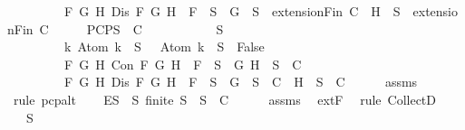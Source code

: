 \begin{isabellebody}
\ \ \ \ \ \ \ \ \ {\isacharparenleft}{\isasymforall}F\ G\ H{\isachardot}\ Dis\ F\ G\ H\ {\isasymlongrightarrow}\ F\ {\isasymin}\ S\ {\isasymlongrightarrow}\ {\isacharbraceleft}G{\isacharbraceright}\ {\isasymunion}\ S\ {\isasymin}\ {\isacharparenleft}extensionFin\ C{\isacharparenright}\ {\isasymor}\ {\isacharbraceleft}H{\isacharbraceright}\ {\isasymunion}\ S\ {\isasymin}\ {\isacharparenleft}extensionFin\ C{\isacharparenright}{\isacharparenright}{\isachardoublequoteclose}\isanewline
%
\isadelimproof
%
\endisadelimproof
%
\isatagproof
{}\isamarkupfalse%
\ {\isacharminus}\isanewline
\ \ \isamarkupfalse%
\ PCP{\isacharcolon}{\isachardoublequoteopen}{\isasymforall}S\ {\isasymin}\ C{\isachardot}\isanewline
\ \ \ \ \ \ \ \ \ {\isasymbottom}\ {\isasymnotin}\ S\ {\isasymand}\isanewline
\ \ \ \ \ \ \ \ \ {\isacharparenleft}{\isasymforall}k{\isachardot}\ Atom\ k\ {\isasymin}\ S\ {\isasymlongrightarrow}\ \isactrlbold {\isasymnot}\ {\isacharparenleft}Atom\ k{\isacharparenright}\ {\isasymin}\ S\ {\isasymlongrightarrow}\ False{\isacharparenright}\ {\isasymand}\isanewline
\ \ \ \ \ \ \ \ \ {\isacharparenleft}{\isasymforall}F\ G\ H{\isachardot}\ Con\ F\ G\ H\ {\isasymlongrightarrow}\ F\ {\isasymin}\ S\ {\isasymlongrightarrow}\ {\isacharbraceleft}G{\isacharcomma}\ H{\isacharbraceright}\ {\isasymunion}\ S\ {\isasymin}\ C{\isacharparenright}\ {\isasymand}\isanewline
\ \ \ \ \ \ \ \ \ {\isacharparenleft}{\isasymforall}F\ G\ H{\isachardot}\ Dis\ F\ G\ H\ {\isasymlongrightarrow}\ F\ {\isasymin}\ S\ {\isasymlongrightarrow}\ {\isacharbraceleft}G{\isacharbraceright}\ {\isasymunion}\ S\ {\isasymin}\ C\ {\isasymor}\ {\isacharbraceleft}H{\isacharbraceright}\ {\isasymunion}\ S\ {\isasymin}\ C{\isacharparenright}{\isachardoublequoteclose}\isanewline
\ \ \ \ \isamarkupfalse%
\ assms{\isacharparenleft}{}{\isacharparenright}\ \isamarkupfalse%
\ {\isacharparenleft}rule\ pcp{\isacharunderscore}alt{}{\isacharparenright}\isanewline
\ \ \isamarkupfalse%
\ E{\isacharcolon}{\isachardoublequoteopen}{\isasymforall}S{\isacharprime}\ {\isasymsubseteq}\ S{\isachardot}\ finite\ S{\isacharprime}\ {\isasymlongrightarrow}\ S{\isacharprime}\ {\isasymin}\ C{\isachardoublequoteclose}\isanewline
\ \ \ \ \isamarkupfalse%
\ assms{\isacharparenleft}{}{\isacharparenright}\ \isamarkupfalse%
\ extF\ \isamarkupfalse%
\ {\isacharparenleft}rule\ CollectD{\isacharparenright}\isanewline
\ \ \isamarkupfalse%
\ {\isachardoublequoteopen}{\isacharbraceleft}{\isacharbraceright}\ {\isasymsubseteq}\ S{\isachardoublequoteclose}\isanewline

\end{isabellebody}
